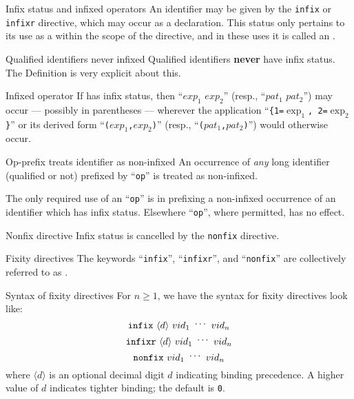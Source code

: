 \begin{definition}{Infix status and infixed operators}
An identifier may be given  by the \texttt{infix}
or \texttt{infixr} directive, which may occur as a declaration.
This status only pertains to its use as a \nonterminal{\vid} within the scope of the
directive, and in these uses it is called an .
\end{definition}

\begin{clause}{Qualified identifiers never infixed}
Qualified identifiers \textbf{never} have infix status. The
Definition is very explicit about this.
\end{clause}

\begin{example}{Infixed operator}
If \nonterminal{\vid} has infix status, then ``$exp_{1}$
\nonterminal{\vid} $exp_{2}$'' (resp., 
``$pat_{1}$ \nonterminal{\vid} $pat_{2}$'') may occur --- possibly in parentheses ---
wherever the application ``\nonterminal{\vid}\verb+{+{\tt 1=}$\exp_{1}$\verb+,+{\tt
2=}$\exp_{2}$\verb+}+'' or its derived form ``\nonterminal{\vid}\verb+(+$exp_{1}$\verb+,+$exp_{2}$\verb+)+'' (resp.,
``\nonterminal{\vid}\verb+(+$pat_{1}$\verb+,+$pat_{2}$\verb+)+'') would otherwise
occur.
\end{example}

\begin{clause}{Op-prefix treats identifier as non-infixed}
An occurrence of \emph{any} long identifier (qualified or not) prefixed
by ``\texttt{op}'' is treated as non-infixed.

The only required use of an ``\texttt{op}'' is in prefixing a
non-infixed occurrence of an identifier \nonterminal{\vid} which has infix
status. Elsewhere ``\texttt{op}'', where permitted, has no effect.
\end{clause}

\begin{definition}{Nonfix directive}
Infix status is cancelled by the \texttt{nonfix} directive.
\end{definition}

\begin{definition}{Fixity directives}
The keywords ``\texttt{infix}'', ``\texttt{infixr}'', and ``\texttt{nonfix}''
are collectively referred to as .
\end{definition}

\begin{clause}{Syntax of fixity directives}
For $n\geq1$, we have the syntax for fixity directives look like:
\[\mathtt{infix}\ \langle d\rangle\ vid_{1}\ \syndots\ vid_{n}\]
\[\mathtt{infixr}\ \langle d\rangle\ vid_{1}\ \syndots\ vid_{n}\]
\[\mathtt{nonfix}\ vid_{1}\ \syndots\ vid_{n}\]
where $\langle d\rangle$ is an optional decimal digit $d$ indicating
binding precedence. A higher value of $d$ indicates tighter binding; the
default is \texttt{0}.
\end{clause}

